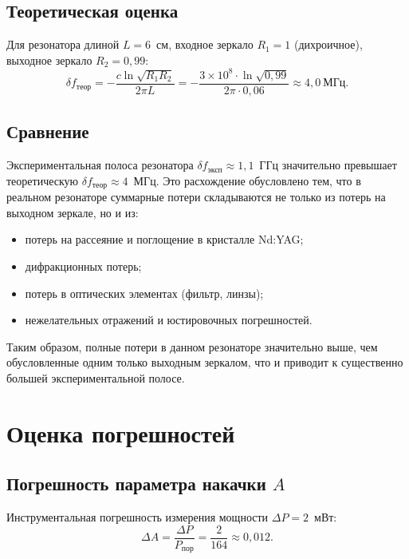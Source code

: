 \documentclass[12pt,a4paper]{article}
\begin{document}
\subsection{Теоретическая оценка}

Для резонатора длиной $L = 6$~см, входное зеркало $R_1 = 1$ (дихроичное),
выходное зеркало $R_2 = 0{,}99$:
\begin{equation}
  \delta f_\text{теор} = -\frac{c\ln\sqrt{R_1 R_2}}{2\pi L}
    = -\frac{3\times10^8 \cdot \ln\sqrt{0{,}99}}{2\pi \cdot 0{,}06}
    \approx 4{,}0~\text{МГц}.
  \label{eq:deltaf_teor_val}
\end{equation}

\subsection{Сравнение}

Экспериментальная полоса резонатора $\delta f_\text{эксп} \approx 1{,}1$~ГГц
значительно превышает теоретическую $\delta f_\text{теор} \approx 4$~МГц.
Это расхождение обусловлено тем, что в реальном резонаторе суммарные потери
складываются не только из потерь на выходном зеркале, но и из:
\begin{itemize}
  \item потерь на рассеяние и поглощение в кристалле Nd:YAG;
  \item дифракционных потерь;
  \item потерь в оптических элементах (фильтр, линзы);
  \item нежелательных отражений и юстировочных погрешностей.
\end{itemize}
Таким образом, полные потери в данном резонаторе значительно выше, чем
обусловленные одним только выходным зеркалом, что и приводит к существенно
большей экспериментальной полосе.

\section{Оценка погрешностей}

\subsection{Погрешность параметра накачки $A$}

Инструментальная погрешность измерения мощности $\Delta P = 2$~мВт:
\begin{equation}
  \Delta A = \frac{\Delta P}{P_\text{пор}} = \frac{2}{164} \approx 0{,}012.
\end{equation}
\end{document}
